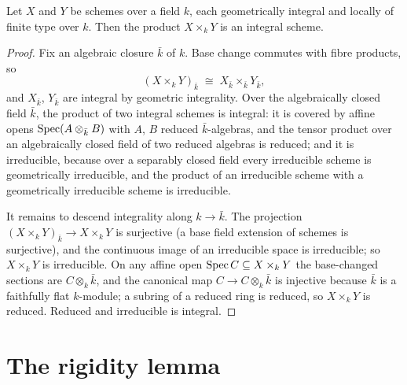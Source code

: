 \begin{lemma}
  \label{pa-lem:product_integral}
  \leanok

  Let \(X\) and \(Y\) be schemes over a field \(k\), each geometrically integral and locally
  of finite type over \(k\). Then the product \(X \times_k Y\) is an integral scheme.
\end{lemma}
\begin{proof}
  \leanok
  Fix an algebraic closure \(\bar k\) of \(k\). Base change commutes with fibre products, so
  \[
    (X \times_k Y)_{\bar k} \;\cong\; X_{\bar k} \times_{\bar k} Y_{\bar k},
  \]
  and \(X_{\bar k}\), \(Y_{\bar k}\) are integral by geometric integrality. Over the
  algebraically closed field \(\bar k\), the product of two integral schemes is integral: it
  is covered by affine opens \(\operatorname{Spec} (A \otimes_{\bar k} B)\) with \(A\), \(B\) reduced
  \(\bar k\)-algebras, and the tensor product over an algebraically closed field of two
  reduced algebras is reduced; and it is irreducible, because over a separably closed field
  every irreducible scheme is geometrically irreducible, and the product of an irreducible
  scheme with a geometrically irreducible scheme is irreducible.

  It remains to descend integrality along \(k \to \bar k\). The projection
  \((X \times_k Y)_{\bar k} \to X \times_k Y\) is surjective (a base field extension of
  schemes is surjective), and the continuous image of an irreducible space is irreducible;
  so \(X \times_k Y\) is irreducible. On any affine open \(\operatorname{Spec} C \subseteq X \times_k Y\)
  the base-changed sections are \(C \otimes_k \bar k\), and the canonical map
  \(C \to C \otimes_k \bar k\) is injective because \(\bar k\) is a faithfully flat
  \(k\)-module; a subring of a reduced ring is reduced, so \(X \times_k Y\) is reduced.
  Reduced and irreducible is integral.
\end{proof}

\section{The rigidity lemma}

